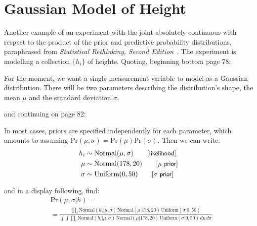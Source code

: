 \documentclass[
twoside=true,
paper=letter,
fontsize=9pt,
pagesize=auto,
leqno,
openany,
headsepline,
overfullrule,
]{scrbook}
\makeatletter
\newcommand{\reqnomode}{\tagsleft@false}
\theoremstyle{plain}
\theoremstyle{plain}
\theoremstyle{definition}
\theoremstyle{bfnoteitalic}
\theoremstyle{bfnoteroman}
\makeatother
\begin{document}
\section{Gaussian Model of Height}\label{gaussian_model}
Another example of an experiment with the joint absolutely continuous with respect to the product of the prior and predictive probability distributions,
paraphrased from \textsl{Statistical Rethinking, Second Edition}~\cite{sr_mcelreath_2020}. 
The experiment is modelling a collection $\{h_i\}$ of heights.
Quoting, beginning bottom page 78:
\begin{quoting}\small
For the moment, we want a single measurement variable to
model as a Gaussian distribution. There will be two parameters describing the distribution's
shape, the mean $\mu$ and the standard deviation $\sigma$.
\end{quoting}
and continuing on page 82:
\begin{quoting}\small
In most cases, priors are specified independently for each parameter, which amounts to assuming
$\text{Pr}(\mu,\sigma) 
= \text{Pr}(\mu)\text{Pr}(\sigma)$. 
Then we can write:\reqnomode
\begin{align*}
h_i & \sim \text{Normal}(\mu,\sigma) \tag*{[\textsf{\small{likelihood}}]} \\
\mu & \sim \text{Normal}(178,20)     \tag*{[\textsf{\small $\mu$ prior}]} \\
\sigma & \sim \text{Uniform}(0,50)   \tag*{[\textsf{\small $\sigma$ prior}]}
\end{align*}
\end{quoting}
and in a display following, find:
\begin{align*}
& \text{Pr}(\mu,\sigma\vert h) =
\\
& =
\frac{
\prod_i
\text{Normal}(h_i\vert \mu,\sigma)
\,\text{Normal}(\mu\vert 178,20)
\,\text{Uniform}(\sigma\vert 0,50)
}
{
\int\int
\prod_i
\text{Normal}(h_i\vert \mu,\sigma)
\,\text{Normal}(\mu\vert 178,20)
\,\text{Uniform}(\sigma\vert 0,50)
\,d\mu\, d\sigma
}
\\
\end{align*}
\end{document}
